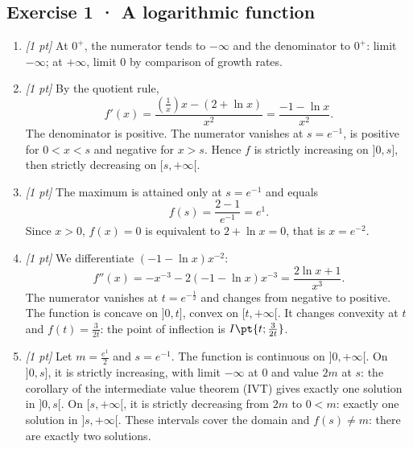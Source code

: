 \subsection*{Exercise 1 · A logarithmic function}\begin{enumerate}

\item \textit{[1 pt]} At $0^+$, the numerator tends to $-\infty$ and the denominator to $0^+$: limit $-\infty$; at $+\infty$, limit $0$ by comparison of growth rates.

\item \textit{[1 pt]} By the quotient rule,
\[f'(x)=\frac{(\frac{1}{x})x-(2+\ln x)}{x^2}=\frac{-1-\ln x}{x^2}.\]
The denominator is positive. The numerator vanishes at $s=e^{-1}$, is positive for $0<x<s$ and negative for $x>s$. Hence $f$ is strictly increasing on $]0,s]$, then strictly decreasing on $[s,+\infty[$.

\item \textit{[1 pt]} The maximum is attained only at $s=e^{-1}$ and equals
\[f(s)=\frac{2- 1}{e^{-1}}=e^{1}.\]
Since $x>0$, $f(x)=0$ is equivalent to $2+\ln x=0$, that is $x=e^{-2}$.

\item \textit{[1 pt]} We differentiate $(-1-\ln x)x^{-2}$:
\[f''(x)=-x^{-3}-2(-1-\ln x)x^{-3}=\frac{2\ln x+1}{x^3}.\]
The numerator vanishes at $t=e^{-\frac{1}{2}}$ and changes from negative to positive. The function is concave on $]0,t]$, convex on $[t,+\infty[$. It changes convexity at $t$ and $f(t)=\frac{3}{2t}$: the point of inflection is $I\pt{t;\frac{3}{2t}}$.

\item \textit{[1 pt]} Let $m=\frac{e^{1}}{2}$ and $s=e^{-1}$. The function is continuous on $]0,+\infty[$. On $]0,s]$, it is strictly increasing, with limit $-\infty$ at $0$ and value $2m$ at $s$: the corollary of the intermediate value theorem (IVT) gives exactly one solution in $]0,s[$. On $[s,+\infty[$, it is strictly decreasing from $2m$ to $0<m$: exactly one solution in $]s,+\infty[$. These intervals cover the domain and $f(s)\ne m$: there are exactly two solutions.

\end{enumerate}

